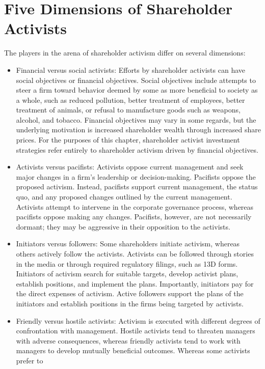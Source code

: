 \documentclass[11pt]{article}
\begin{document}
\section*{Five Dimensions of Shareholder Activists}
The players in the arena of shareholder activism differ on several dimensions:

\begin{itemize}
  \item Financial versus social activists: Efforts by shareholder activists can have social objectives or financial objectives. Social objectives include attempts to steer a firm toward behavior deemed by some as more beneficial to society as a whole, such as reduced pollution, better treatment of employees, better treatment of animals, or refusal to manufacture goods such as weapons, alcohol, and tobacco. Financial objectives may vary in some regards, but the underlying motivation is increased shareholder wealth through increased share prices. For the purposes of this chapter, shareholder activist investment strategies refer entirely to shareholder activism driven by financial objectives.
  \item Activists versus pacifists: Activists oppose current management and seek major changes in a firm's leadership or decision-making. Pacifists oppose the proposed activism. Instead, pacifists support current management, the status quo, and any proposed changes outlined by the current management. Activists attempt to intervene in the corporate governance process, whereas pacifists oppose making any changes. Pacifists, however, are not necessarily dormant; they may be aggressive in their opposition to the activists.
  \item Initiators versus followers: Some shareholders initiate activism, whereas others actively follow the activists. Activists can be followed through stories in the media or through required regulatory filings, such as 13D forms. Initiators of activism search for suitable targets, develop activist plans, establish positions, and implement the plans. Importantly, initiators pay for the direct expenses of activism. Active followers support the plans of the initiators and establish positions in the firms being targeted by activists.
  \item Friendly versus hostile activists: Activism is executed with different degrees of confrontation with management. Hostile activists tend to threaten managers with adverse consequences, whereas friendly activists tend to work with managers to develop mutually beneficial outcomes. Whereas some activists prefer to\\

\end{itemize}
\end{document}
